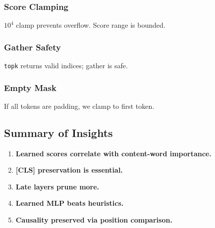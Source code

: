 \subsubsection{Score Clamping}

$10^4$ clamp prevents overflow. Score range is bounded.

\subsubsection{Gather Safety}

\texttt{topk} returns valid indices; gather is safe.

\subsubsection{Empty Mask}

If all tokens are padding, we clamp to first token.

\subsection{Summary of Insights}

\begin{enumerate}
\item \textbf{Learned scores correlate with content-word importance.}
\item \textbf{[CLS] preservation is essential.}
\item \textbf{Late layers prune more.}
\item \textbf{Learned MLP beats heuristics.}
\item \textbf{Causality preserved via position comparison.}

\end{enumerate}
